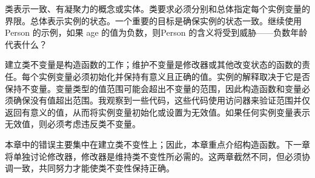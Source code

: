 
类表示一致、有凝聚力的概念或实体。类要求必须分别和总体指定每个实例变量的界限。总体表示实例的状态。一个重要的目标是确保实例的状态一致。继续使用 Person 的示例，如果 age 的值为负数，则Person 的含义将受到威胁——负数年龄代表什么？

建立类不变量是构造函数的工作；维护不变量是修改器或其他改变状态的函数的责任。每个实例变量必须初始化并保持有意义且正确的值。实例的解释取决于它是否保持不变量。变量类型的值范围可能会超出不变量的范围，因此构造函数和变量必须确保没有值超出范围。我观察到一些代码，这些代码使用访问器来验证范围并仅返回有意义的值，从而将实例变量初始化或设置为无效值。如果任何实例变量表示无效值，则必须考虑违反类不变量。

本章中的错误主要集中在建立类不变性上；因此，本章重点介绍构造函数。下一章将单独讨论修改器，修改器是维持类不变性所必需的。这两章截然不同，但必须协调一致，共同努力才能使类不变性保持正确。
